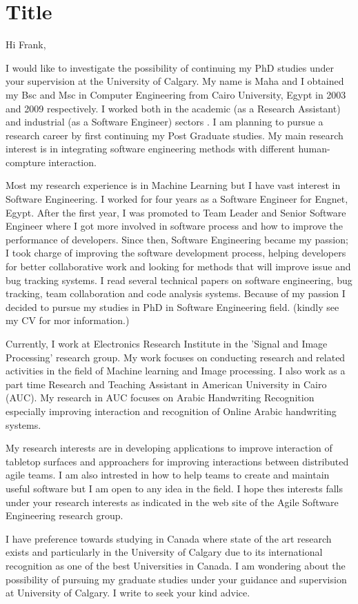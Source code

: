 \documentclass{article}
\begin{document}
\section{Title}

Hi Frank,

I would like to  investigate the possibility of continuing my PhD studies under
your supervision at the University of Calgary.  My name is Maha and I obtained
my Bsc and Msc in Computer Engineering from  Cairo University, Egypt in  2003
and 2009 respectively.  I worked both in the academic (as a Research Assistant)
and industrial (as a Software Engineer) sectors . I am planning to pursue a
research career by first continuing my Post Graduate studies. My main research
interest is in integrating software engineering methods
with different human-compture interaction.

Most my research experience is in Machine Learning but I have vast interest in
Software Engineering. I worked for four years as a Software Engineer for Engnet,
Egypt. After the first year, I was promoted to Team Leader and Senior Software
Engineer where I got more involved in software process and how to improve the
performance of developers. Since then, Software Engineering became my passion;
I took charge of improving the software development process,
helping developers for better collaborative work and looking for methods that will improve issue and bug tracking systems.
     I read  several  technical papers on software engineering, bug tracking,
     team collaboration and code analysis systems.  Because of my passion I
     decided to pursue my studies in PhD in Software Engineering field. (kindly
     see my CV for mor information.)


Currently, I work at Electronics Research Institute in the 'Signal and Image
Processing' research group. My work focuses on conducting research and related activities in the field of Machine learning and Image processing. I also work as a part time Research and Teaching Assistant in American University in Cairo (AUC).
  My research in AUC focuses on Arabic Handwriting Recognition especially improving interaction and recognition of Online Arabic handwriting systems.

 My research interests are in developing applications to improve
     interaction of tabletop surfaces and approachers for improving interactions
     between distributed agile teams. I am also intrested in how to help teams to create
     and maintain useful software but I am open to any idea in the field. I
     hope thes interests falls under your research interests as indicated in the web site of the Agile Software Engineering research group.


     I have preference towards studying in Canada where state of the art
     research exists and particularly in the University of Calgary due to its
     international recognition as one of the best Universities in Canada. I am
     wondering about the possibility of pursuing my graduate studies under your guidance and supervision at University of Calgary. I
write to seek your kind advice.
\end{document}
